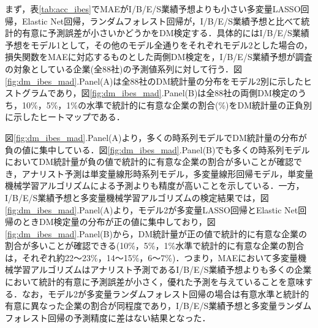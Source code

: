 \documentclass[a4paper，11pt]{jsarticle}
\begin{document}
まず，表\ref{tab:acc_ibes}でMAEがI/B/E/S業績予想よりも小さい多変量LASSO回帰，Elastic Net回帰，ランダムフォレスト回帰が，I/B/E/S業績予想と比べて統計的有意に予測誤差が小さいかどうかをDM検定する．具体的にはI/B/E/S業績予想をモデル1として，その他のモデル全通りをそれぞれモデル2とした場合の，損失関数をMAEに対応するものとした両側DM検定を，I/B/E/S業績予想が調査の対象としている企業(全88社)の予測値系列に対して行う．図\ref{fig:dm_ibes_mad}.Panel(A)は全88社のDM統計量の分布をモデル2別に示したヒストグラムであり，図\ref{fig:dm_ibes_mad}.Panel(B)は全88社の両側DM検定のうち，10\%，5\%，1\%の水準で統計的に有意な企業の割合(\%)をDM統計量の正負別に示したヒートマップである．

図\ref{fig:dm_ibes_mad}.Panel(A)より，多くの時系列モデルでDM統計量の分布が負の値に集中している．図\ref{fig:dm_ibes_mad}.Panel(B)でも多くの時系列モデルにおいてDM統計量が負の値で統計的に有意な企業の割合が多いことが確認でき，アナリスト予測は単変量線形時系列モデル，多変量線形回帰モデル，単変量機械学習アルゴリズムによる予測よりも精度が高いことを示している．一方，I/B/E/S業績予想と多変量機械学習アルゴリズムの検定結果では，図\ref{fig:dm_ibes_mad}.Panel(A)より，モデル2が多変量LASSO回帰とElastic Net回帰のときDM検定量の分布が正の値に集中しており，図\ref{fig:dm_ibes_mad}.Panel(B)から，DM統計量が正の値で統計的に有意な企業の割合が多いことが確認できる(10\%，5\%，1\%水準で統計的に有意な企業の割合は，それぞれ約22～23\%，14～15\%，6～7\%)．つまり，MAEにおいて多変量機械学習アルゴリズムはアナリスト予測であるI/B/E/S業績予想よりも多くの企業において統計的有意に予測誤差が小さく，優れた予測を与えていることを意味する．なお，モデル2が多変量ランダムフォレスト回帰の場合は有意水準と統計的有意に異なった企業の割合が同程度であり，I/B/E/S業績予想と多変量ランダムフォレスト回帰の予測精度に差はない結果となった．
\end{document}
